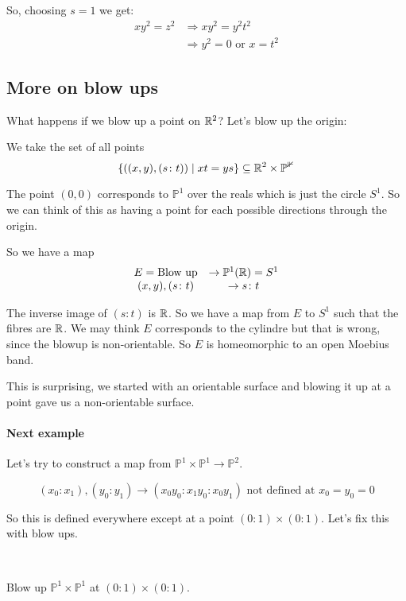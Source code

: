 So, choosing $s=1$ we get:\begin{align*}
    xy^2 = z^2 &\Rightarrow xy^2 = y^2t^2\\
    &\Rightarrow y^2 = 0\text{ or }x=t^2
\end{align*}


\subsection{More on blow ups}
What happens if we blow up a point on $\mathbb{R}^2$? Let's blow up the origin:

We take the set of all points \[\{((x,y), (s\colon t)) \mid xt=ys\}\subseteq \mathbb{R}^2\times \mathbb{P^1} \]

The point $(0,0)$ corresponds to $\mathbb{P}^1$ over the reals which is just the circle $S^1$. So we can think of this as having a point for each possible directions through the origin.

So we have a map \[\begin{array}{cc}
    E = \text{Blow up} &\rightarrow \mathbb{P}^1(\mathbb{R}) = S^1\\
    (x,y),(s\colon t)&\rightarrow s\colon t
\end{array}\]

The inverse image of $(s\colon t)$ is $\mathbb{R}$. 
So we have a map from $E$ to $S^1$ such that the fibres are $\mathbb{R}$. We may think $E$ corresponds to the cylindre but that is wrong, since the blowup is non-orientable. So $E$ is homeomorphic to an open Moebius band.

This is surprising, we started with an orientable surface and blowing it up at a point gave us a non-orientable surface.


\paragraph*{Next example}

Let's try to construct a map from $\mathbb{P}^1\times \mathbb{P}^1\rightarrow \mathbb{P}^2$. 

\[(x_0\colon x_1),(y_0\colon y_1)\rightarrow (x_0y_0\colon x_1y_0\colon x_0y_1) \text{ not defined at }x_0=y_0 = 0\]

So this is defined everywhere except at a point $(0\colon 1)\times (0\colon 1)$. Let's fix this with blow ups.

\

Blow up $\mathbb{P}^1\times \mathbb{P}^1$ at $(0\colon 1)\times (0\colon 1)$. 

